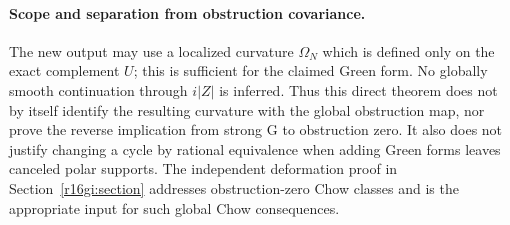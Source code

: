 \paragraph{Scope and separation from obstruction covariance.}
The new output may use a localized curvature $\Omega_N$ which is
defined only on the exact complement $U$; this is sufficient for
the claimed Green form.  No globally smooth continuation through
$i|Z|$ is inferred.  Thus this direct theorem does not by itself
identify the resulting curvature with the global obstruction map,
nor prove the reverse implication from strong G to obstruction zero.
It also does not justify changing a cycle by rational equivalence
when adding Green forms leaves canceled polar supports.  The
independent deformation proof in Section~\ref{r16gi:section}
addresses obstruction-zero Chow classes and is the appropriate
input for such global Chow consequences.

